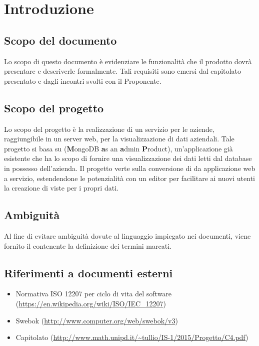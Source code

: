 \section{Introduzione}
\subsection{Scopo del documento}
Lo scopo di questo documento è evidenziare le funzionalit\`a che il prodotto dovr\`a presentare e descriverle formalmente. Tali requisiti sono emersi dal capitolato presentato e dagli incontri svolti con il Proponente.

\subsection{Scopo del progetto}
Lo scopo del progetto è la realizzazione di un servizio per le aziende, raggiungibile in un server web, per la visualizzazione di dati aziendali. Tale progetto si basa su  (\textbf{M}ongoDB \textbf{a}s an \textbf{a}dmin \textbf{P}roduct), un'applicazione già esistente che ha lo scopo di fornire una visualizzazione dei dati letti dal database  in possesso dell'azienda. Il progetto verte sulla conversione di  da applicazione web a servizio, estendendone le potenzialità con un editor per facilitare ai nuovi utenti la creazione di viste per i propri dati.

\subsection{Ambiguit\`a} 
Al fine di evitare ambiguità dovute al linguaggio impiegato nei documenti, viene fornito il \Glossario  contenente la definizione dei termini marcati.

\subsection{Riferimenti a documenti esterni}
\begin{itemize}
\item Normativa ISO 12207 per ciclo di vita del software (\url{https://en.wikipedia.org/wiki/ISO/IEC_12207})
\item Swebok (\url{http://www.computer.org/web/swebok/v3})
\item Capitolato (\url{http://www.math.unipd.it/~tullio/IS-1/2015/Progetto/C4.pdf})
\end{itemize}

